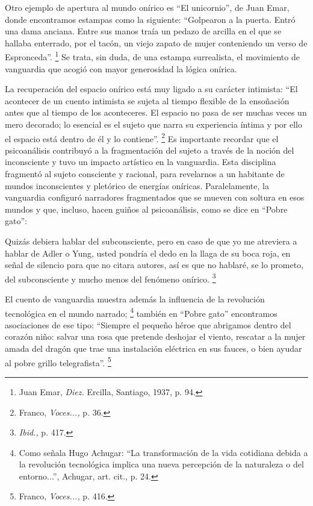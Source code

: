 \documentclass[14pt,twoside,final]{extbook} %
\let\oldfootnote\footnote
\renewcommand\footnote[1]{%
\oldfootnote{\hspace{1mm}#1}}
\begin{document}
Otro ejemplo de apertura al mundo onírico es ``El unicornio'', de Juan Emar, donde encontramos estampas como la siguiente: ``Golpearon a la puerta. Entró una dama anciana. Entre sus manos traía un pedazo de arcilla en el que se hallaba enterrado, por el tacón, un viejo zapato de mujer conteniendo un verso de Espronceda''.\footnote{Juan Emar, \emph{Diez.} Ercilla, Santiago, 1937, p. 94.} Se trata, sin duda, de una estampa surrealista, el movimiento de vanguardia que acogió con mayor generosidad la lógica onírica.

La recuperación del espacio onírico está muy ligado a su carácter intimista: ``El acontecer de un cuento intimista se sujeta al tiempo flexible de la ensoñación antes que al tiempo de los aconteceres. El espacio no pasa de ser muchas veces un mero decorado; lo esencial es el sujeto que narra su experiencia íntima y por ello el espacio está dentro de él y lo contiene''.\footnote{Franco, \emph{Voces...,} p. 36.} Es importante recordar que el psicoanálisis contribuyó a la fragmentación del sujeto a través de la noción del inconsciente y tuvo un impacto artístico en la vanguardia. Esta disciplina fragmentó al sujeto consciente y racional, para revelarnos a un habitante de mundos inconscientes y pletórico de energías oníricas. Paralelamente, la vanguardia configuró narradores fragmentados que se mueven con soltura en esos mundos y que, incluso, hacen guiños al psicoanálisis, como se dice en ``Pobre gato'':
\begin{quoting}
Quizás debiera hablar del subconsciente, pero en caso de que yo me atreviera a hablar de Adler o Yung, usted pondría el dedo en la llaga de su boca roja, en señal de silencio para que no citara autores, así es que no hablaré, se lo prometo, del subconsciente y mucho menos del fenómeno onírico.\footnote{\emph{Ibid.,} p. 417.}
\end{quoting}
El cuento de vanguardia muestra además la influencia de la revolución tecnológica en el mundo narrado;\footnote{Como señala Hugo Achugar: ``La transformación de la vida cotidiana debida a la
revolución tecnológica implica una nueva percepción de la naturaleza o del entorno...'', Achugar, art. cit., p. 24.} también en ``Pobre gato'' encontramos asociaciones de ese tipo: ``Siempre el pequeño héroe que abrigamos dentro del corazón niño: salvar una rosa que pretende deshojar el viento, rescatar a la mujer amada del dragón que trae una instalación eléctrica en sus fauces, o bien ayudar al pobre grillo telegrafista''.\footnote{Franco, \emph{Voces...,} p. 416.}
\end{document}

